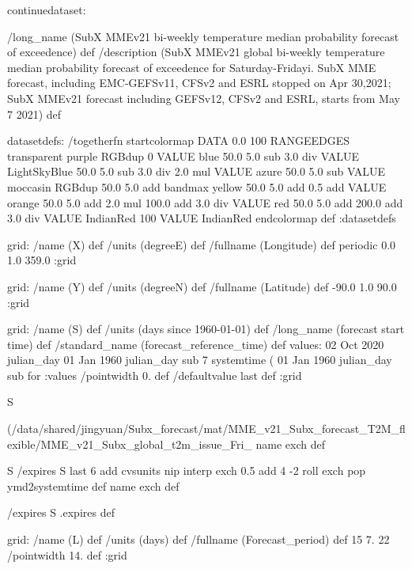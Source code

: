 \begin{ingrid}

continuedataset:

/long_name (SubX MMEv21 bi-weekly temperature median probability forecast of exceedence) def
/description (SubX MMEv21 global bi-weekly temperature median probability forecast of exceedence for Saturday-Fridayi. SubX MME forecast, including EMC-GEFSv11, CFSv2 and ESRL stopped on Apr 30,2021; SubX MMEv21 forecast including GEFSv12, CFSv2 and ESRL, starts from May 7 2021) def

datasetdefs:
/togetherfn {
startcolormap 
DATA 0.0 100 RANGEEDGES
    transparent purple RGBdup
       0 VALUE
       blue 50.0
         5.0 sub
         3.0 div
         VALUE
         LightSkyBlue 50.0
          5.0 sub
          3.0 div
          2.0 mul
          VALUE
          azure 50.0
           5.0 sub
           VALUE
          moccasin RGBdup 50.0
             5.0 add
             bandmax
             yellow 50.0
              5.0 add
              0.5 add
              VALUE
              orange 50.0
               5.0 add
               2.0 mul
               100.0 add
               3.0 div
               VALUE
               red 50.0
                5.0 add
                200.0 add
                3.0 div
                VALUE
               IndianRed
                100 VALUE
                IndianRed
endcolormap
} def
:datasetdefs


grid:
/name (X) def
/units (degreeE) def
/fullname (Longitude) def
periodic
0.0 1.0 359.0
:grid

grid:
/name (Y) def
/units (degreeN) def
/fullname (Latitude) def
-90.0 1.0 90.0
:grid


grid:
/name (S) def
/units (days since 1960-01-01) def
/long_name (forecast start time) def
/standard_name (forecast_reference_time) def
values:
02 Oct 2020 julian_day 01 Jan 1960 julian_day sub
7
systemtime
(%
01 Jan 1960 julian_day sub 
{} for
:values
/pointwidth 0. def
/defaultvalue { last } def
:grid

S {(/data/shared/jingyuan/Subx_forecast/mat/MME_v21_Subx_forecast_T2M_flexible/MME_v21_Subx_global_t2m_issue_Fri_%
name exch def

S
/expires
S last 6 add cvsunits nip interp exch 0.5 add 4 -2 roll exch pop ymd2systemtime
def
name exch def

/expires S .expires def


grid:
/name (L) def
/units (days) def
/fullname (Forecast_period) def
15 7. 22
/pointwidth 14. def
:grid

}
\end{ingrid}
